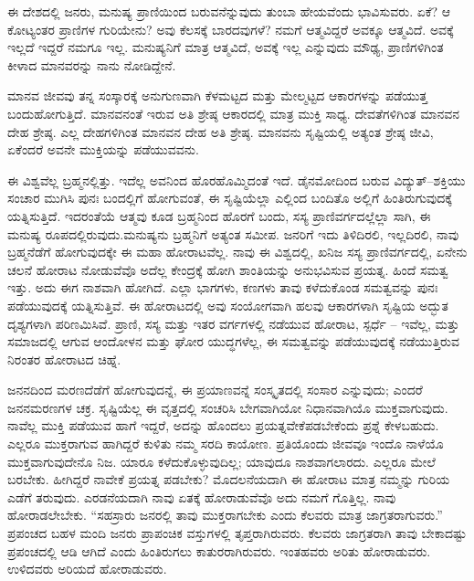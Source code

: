 ಈ ದೇಶದಲ್ಲಿ ಜನರು, ಮನುಷ್ಯ ಪ್ರಾಣಿಯಿಂದ ಬರುವನೆನ್ನುವುದು ತುಂಬಾ ಹೇಯವೆಂದು ಭಾವಿಸುವರು. ಏಕೆ? ಆ ಕೋಟ್ಯಂತರ ಪ್ರಾಣಿಗಳ ಗುರಿಯೇನು? ಅವು ಕೆಲಸಕ್ಕೆ ಬಾರದವುಗಳೆ? ನಮಗೆ ಆತ್ಮವಿದ್ದರೆ ಅವಕ್ಕೂ ಆತ್ಮವಿದೆ. ಅವಕ್ಕೆ ಇಲ್ಲದೆ ಇದ್ದರೆ ನಮಗೂ ಇಲ್ಲ. ಮನುಷ್ಯನಿಗೆ ಮಾತ್ರ ಆತ್ಮವಿದೆ, ಅವಕ್ಕೆ ಇಲ್ಲ ಎನ್ನುವುದು ಮೌಢ್ಯ, ಪ್ರಾಣಿಗಳಿಗಿಂತ ಕೀಳಾದ ಮಾನವರನ್ನು ನಾನು ನೋಡಿದ್ದೇನೆ.

ಮಾನವ ಜೀವವು ತನ್ನ ಸಂಸ್ಕಾರಕ್ಕೆ ಅನುಗುಣವಾಗಿ ಕೆಳಮಟ್ಟದ ಮತ್ತು ಮೇಲ್ಮಟ್ಟದ ಆಕಾರಗಳನ್ನು ಪಡೆಯುತ್ತ ಬಂದುಹೋಗುತ್ತಿದೆ. ಮಾನವನಂತೆ ಇರುವ ಅತಿ ಶ್ರೇಷ್ಠ ಆಕಾರದಲ್ಲಿ ಮಾತ್ರ ಮುಕ್ತಿ ಸಾಧ್ಯ. ದೇವತೆಗಳಿಗಿಂತ ಮಾನವನ ದೇಹ ಶ್ರೇಷ್ಠ. ಎಲ್ಲ ದೇಹಗಳಿಗಿಂತ ಮಾನವನ ದೇಹ ಅತಿ ಶ್ರೇಷ್ಠ. ಮಾನವನು ಸೃಷ್ಟಿಯಲ್ಲಿ ಅತ್ಯಂತ ಶ್ರೇಷ್ಠ ಜೀವಿ, ಏಕೆಂದರೆ ಅವನೇ ಮುಕ್ತಿಯನ್ನು ಪಡೆಯುವವನು.

ಈ ವಿಶ್ವವೆಲ್ಲ ಬ್ರಹ್ಮನಲ್ಲಿತ್ತು. ಇದೆಲ್ಲ ಅವನಿಂದ ಹೊರಹೊಮ್ಮಿದಂತೆ ಇದೆ. ಡೈನಮೋದಿಂದ ಬರುವ ವಿದ್ಯುತ್​–ಶಕ್ತಿಯು ಸಂಚಾರ ಮುಗಿಸಿ ಪುನಃ ಬಂದಲ್ಲಿಗೆ ಹೋಗುವಂತೆ, ಈ ಸೃಷ್ಟಿಯೆಲ್ಲಾ ಎಲ್ಲಿಂದ ಬಂದಿತೊ ಅಲ್ಲಿಗೆ ಹಿಂತಿರುಗುವುದಕ್ಕೆ ಯತ್ನಿಸುತ್ತಿದೆ. ಇದರಂತೆಯೆ ಆತ್ಮವು ಕೂಡ ಬ್ರಹ್ಮನಿಂದ ಹೊರಗೆ ಬಂದು, ಸಸ್ಯ ಪ್ರಾಣಿವರ್ಗದಲ್ಲೆಲ್ಲಾ ಸಾಗಿ, ಈ ಮನುಷ್ಯ ರೂಪದಲ್ಲಿರುವುದು.ಮನುಷ್ಯನು ಬ್ರಹ್ಮನಿಗೆ ಅತ್ಯಂತ ಸಮೀಪ. ಜನರಿಗೆ ಇದು ತಿಳಿದಿರಲಿ, ಇಲ್ಲದಿರಲಿ, ನಾವು ಬ್ರಹ್ಮನೆಡೆಗೆ ಹೋಗುವುದಕ್ಕೇ ಈ ಮಹಾ ಹೋರಾಟವೆಲ್ಲ. ನಾವು ಈ ವಿಶ್ವದಲ್ಲಿ, ಖನಿಜ ಸಸ್ಯ ಪ್ರಾಣಿವರ್ಗದಲ್ಲಿ, ಏನೇನು ಚಲನೆ ಹೋರಾಟ ನೋಡುವೆವೊ ಅದೆಲ್ಲ ಕೇಂದ್ರಕ್ಕೆ ಹೋಗಿ ಶಾಂತಿಯನ್ನು ಅನುಭವಿಸುವ ಪ್ರಯತ್ನ. ಹಿಂದೆ ಸಮತ್ವ ಇತ್ತು. ಅದು ಈಗ ನಾಶವಾಗಿ ಹೋಗಿದೆ. ಎಲ್ಲಾ ಭಾಗಗಳು, ಕಣಗಳು ತಾವು ಕಳೆದುಕೊಂಡ ಸಮತ್ವವನ್ನು ಪುನಃ ಪಡೆಯುವುದಕ್ಕೆ ಯತ್ನಿಸುತ್ತಿವೆ. ಈ ಹೋರಾಟದಲ್ಲಿ ಅವು ಸಂಯೋಗವಾಗಿ ಹಲವು ಆಕಾರಗಳಾಗಿ ಸೃಷ್ಟಿಯ ಅದ್ಭುತ ದೃಶ್ಯಗಳಾಗಿ ಪರಿಣಮಿಸಿವೆ. ಪ್ರಾಣಿ, ಸಸ್ಯ ಮತ್ತು ಇತರ ವರ್ಗಗಳಲ್ಲಿ ನಡೆಯುವ ಹೋರಾಟ, ಸ್ಪರ್ಧೆ – ಇವೆಲ್ಲ, ಮತ್ತು ಸಮಾಜದಲ್ಲಿ ಆಗುವ ಆಂದೋಳನ ಮತ್ತು ಘೋರ ಯುದ್ಧಗಳೆಲ್ಲ, ಈ ಸಮತ್ವವನ್ನು ಪಡೆಯುವುದಕ್ಕೆ ನಡೆಯು\break ತ್ತಿರುವ ನಿರಂತರ ಹೋರಾಟದ ಚಿಹ್ನೆ.

ಜನನದಿಂದ ಮರಣದೆಡೆಗೆ ಹೋಗುವುದನ್ನೆ, ಈ ಪ್ರಯಾಣವನ್ನೆ ಸಂಸ್ಕೃತದಲ್ಲಿ ಸಂಸಾರ ಎನ್ನುವುದು; ಎಂದರೆ ಜನನಮರಣಗಳ ಚಕ್ರ. ಸೃಷ್ಟಿಯೆಲ್ಲ ಈ ವೃತ್ತದಲ್ಲಿ ಸಂಚರಿಸಿ ಬೇಗವಾಗಿಯೋ ನಿಧಾನವಾಗಿಯೊ ಮುಕ್ತವಾಗುವುದು. ನಾವೆಲ್ಲ ಮುಕ್ತಿ ಪಡೆಯುವ ಹಾಗೆ ಇದ್ದರೆ, ಅದನ್ನು ಹೊಂದಲು ಪ್ರಯತ್ನವೇಕೆಪಡಬೇಕೆಂದು ಪ್ರಶ್ನೆ ಕೇಳಬಹುದು. ಎಲ್ಲರೂ ಮುಕ್ತರಾಗುವ ಹಾಗಿದ್ದರೆ ಕುಳಿತು ನಮ್ಮ ಸರದಿ ಕಾಯೋಣ. ಪ್ರತಿಯೊಂದು ಜೀವವೂ ಇಂದೊ ನಾಳೆಯೊ ಮುಕ್ತವಾಗುವುದೇನೊ ನಿಜ. ಯಾರೂ ಕಳೆದುಕೊಳ್ಳುವುದಿಲ್ಲ; ಯಾವುದೂ ನಾಶವಾಗಲಾರದು. ಎಲ್ಲರೂ ಮೇಲೆ ಬರಬೇಕು. ಹೀಗಿದ್ದರೆ ನಾವೇಕೆ ಪ್ರಯತ್ನ ಪಡಬೇಕು? ಮೊದಲನೆಯದಾಗಿ ಈ ಹೋರಾಟ ಮಾತ್ರ ನಮ್ಮನ್ನು ಗುರಿಯ ಎಡೆಗೆ ತರುವುದು. ಎರಡನೆಯದಾಗಿ ನಾವು ಏತಕ್ಕೆ ಹೋರಾಡುವೆವೊ ಅದು ನಮಗೆ ಗೊತ್ತಿಲ್ಲ. ನಾವು ಹೋರಾಡಲೇಬೇಕು. “ಸಹಸ್ರಾರು ಜನರಲ್ಲಿ ತಾವು ಮುಕ್ತರಾಗಬೇಕು ಎಂದು ಕೆಲವರು ಮಾತ್ರ ಜಾಗ್ರತರಾಗುವರು.” ಪ್ರಪಂಚದ ಬಹಳ ಮಂದಿ ಜನರು ಪ್ರಾಪಂಚಿಕ ವಸ್ತುಗಳಲ್ಲಿ ತೃಪ್ತರಾಗಿರುವರು. ಕೆಲವರು ಜಾಗ್ರತರಾಗಿ ತಾವು ಬೇಕಾದಷ್ಟು ಪ್ರಪಂಚದಲ್ಲಿ ಆಡಿ ಆಗಿದೆ ಎಂದು ಹಿಂತಿರುಗಲು ಕಾತುರರಾಗಿರುವರು. ಇಂತಹವರು ಅರಿತು ಹೋರಾಡುವರು. ಉಳಿದವರು ಅರಿಯದೆ ಹೋರಾಡುವರು.

